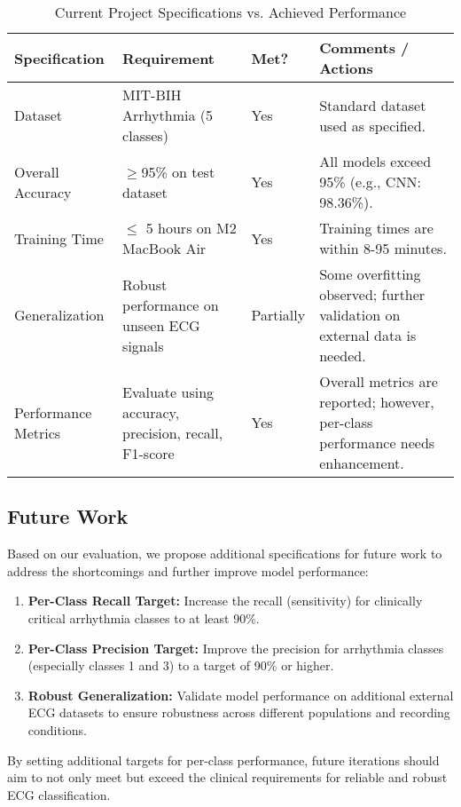 \begin{table}[b]
    \centering
    \caption{Current Project Specifications vs. Achieved Performance}
    \label{tab:current_specs}
    \begin{tabular}{|p{4.2cm}|p{4.0cm}|p{1.7cm}|p{5.2cm}|}
        \hline
        \textbf{Specification} & \textbf{Requirement} & \textbf{Met?} & \textbf{Comments / Actions} \\
        \hline
        Dataset & MIT-BIH Arrhythmia (5 classes) & Yes & Standard dataset used as specified. \\
        \hline
        Overall Accuracy & $\geq$95\% on test dataset & Yes & All models exceed 95\% (e.g., CNN: 98.36\%). \\
        \hline
        Training Time & $\leq$ 5 hours on M2 MacBook Air & Yes & Training times are within 8-95 minutes. \\
        \hline
        Generalization & Robust performance on unseen ECG signals & Partially & Some overfitting observed; further validation on external data is needed. \\
        \hline
        Performance Metrics & Evaluate using accuracy, precision, recall, F1-score & Yes & Overall metrics are reported; however, per-class performance needs enhancement. \\
        \hline
    \end{tabular}
\end{table}

\subsection{Future Work}
Based on our evaluation, we propose additional specifications for future work to address the shortcomings and further improve model performance:

\begin{enumerate}
    \item \textbf{Per-Class Recall Target:} Increase the recall (sensitivity) for clinically critical arrhythmia classes to at least 90\%.
    \item \textbf{Per-Class Precision Target:} Improve the precision for arrhythmia classes (especially classes 1 and 3) to a target of 90\% or higher.
    \item \textbf{Robust Generalization:} Validate model performance on additional external ECG datasets to ensure robustness across different populations and recording conditions.
\end{enumerate}

By setting additional targets for per-class performance, future iterations should aim to not only meet but exceed the clinical requirements for reliable and robust ECG classification.
